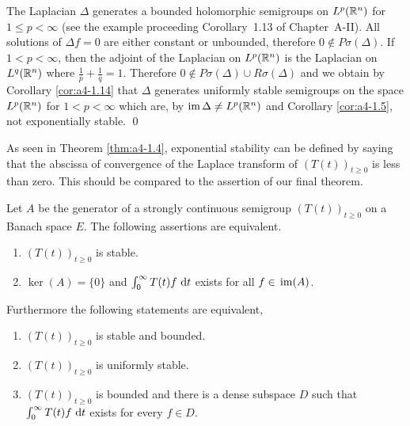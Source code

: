 \begin{example}\label{ex:a4-15}
The Laplacian $\Delta$ generates a bounded holomorphic semigroups on $L^{p}(\mathbb{R}^{n})$ for $1 \leq p < \infty$ (see the example proceeding
Corollary~1.13 of Chapter~A-II). 
All solutions of $\Delta f = 0$ are either constant
or unbounded, therefore $0 \not\in P\sigma(\Delta)$. 
If $1 < p < \infty$, then the adjoint
of the Laplacian on $L^{p}(\mathbb{R}^{n})$ is the Laplacian on $L^{q}(\mathbb{R}^{n})$ where
$\frac{1}{p} + \frac{1}{q} = 1$. 
Therefore $0 \not\in P\sigma(\Delta) \cup R\sigma(\Delta)$ and we obtain by Corollary \ref{cor:a4-1.14}
that $\Delta$ generates uniformly stable semigroups on the space $L^{p}(\mathbb{R}^{n})$
for $1 < p < \infty$ which are, by $\mathop{}\!\mathrm{im}\, \Delta \not= L^{p}(\mathbb{R}^{n})$ and Corollary \ref{cor:a4-1.5}, not exponentially stable. \qed
\end{example}
As seen in Theorem \ref{thm:a4-1.4}, exponential stability can be defined by saying that the abscissa of convergence of the Laplace transform of $(T(t))_{t \geq 0}$ is less than zero. 
This should be compared to the assertion of our final theorem.
\begin{theorem}\label{thm:a4-1.16}
Let $A$ be the generator of a strongly continuous semigroup $(T(t))_{t \geq 0}$ on a Banach space $E$. 
The following assertions are equivalent.
\begin{enumerate}[\upshape (a)]
\item 
$(T(t))_{t \geq 0}$ is stable.

\item 
$\ker(A) = \{0\}$ and $\int_{0}^{\infty} T(t)f \,\mathop{}\!\mathrm{d}{t}$ exists for all $f \in \mathop{}\mathrm{im}(A)$.

\end{enumerate}
Furthermore the following statements are equivalent,
\begin{enumerate}[(a')]
\item $(T(t))_{t \geq 0}$ is stable and bounded.
\item $(T(t))_{t \geq 0}$ is uniformly stable.
\item $(T(t))_{t \geq 0}$ is bounded and there is a dense subspace $D$ such that $\int_{0}^{\infty} T(t)f \,\mathop{}\!\mathrm{d}{t}$ exists for every $f \in D$.
\end{enumerate}
\end{theorem}

